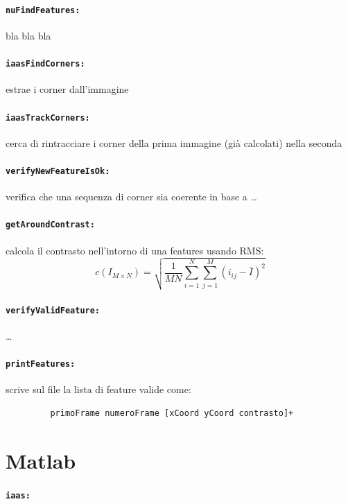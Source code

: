 \documentclass[12pt]{report}
\begin{document}
\paragraph*{\verb_nuFindFeatures:_} bla bla bla

\paragraph*{\verb_iaasFindCorners:_} estrae i corner dall'immagine

\paragraph*{\verb_iaasTrackCorners:_} cerca di rintracciare i corner della prima immagine (gi\`a calcolati) nella seconda

\paragraph*{\verb_verifyNewFeatureIsOk:_} verifica che una sequenza di corner sia coerente in base a \dots

\paragraph*{\verb_getAroundContrast:_} calcola il contrasto nell'intorno di una features usando RMS: $$ c\left(I_{M\times N}\right) = \sqrt{\frac{1}{MN}\sum_{i=1}^N\sum_{j=1}^M(i_{ij}-\bar{I})^2} $$

\paragraph*{\verb_verifyValidFeature:_} \dots


\paragraph*{\verb_printFeatures:_} scrive sul file la lista di feature valide come:
\begin{verbatim}
	     primoFrame numeroFrame [xCoord yCoord contrasto]+
\end{verbatim}

\section{Matlab}

\paragraph*{\verb_iaas:_}
\end{document}
